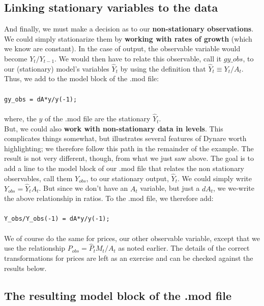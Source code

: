 \subsection{Linking stationary variables to the data}
And finally, we must make a decision as to our \textbf{non-stationary observations}. We could simply stationarize them by \textbf{working with rates of growth} (which we know are constant). In the case of output, the observable variable would become $Y_t /Y_{t-1}$. We would then have to relate this observable, call it $gy\_{obs}$, to our (stationary) model's variables $\widehat Y_t$ by using the definition that $ \widehat{Y}_t \equiv Y_t/ A_t$. Thus, we add to the model block of the .mod file: \\
\\
\texttt{gy\_obs = dA*y/y(-1);}\\
\\
where, the $y$ of the .mod file are the stationary $\widehat Y_t$.\\

But, we could also \textbf{work with non-stationary data in levels}. This complicates things somewhat, but illustrates several features of Dynare worth highlighting; we therefore follow this path in the remainder of the example. The result is not very different, though, from what we just saw above. The goal is to add a line to the model block of our .mod file that relates the non stationary observables, call them $Y_{obs}$, to our stationary output, $\widehat Y_t$. We could simply write $Y_{obs} = \widehat Y_t A_t$. But since we don't have an $A_t$ variable, but just a $dA_t$, we we-write the above relationship in ratios. To the .mod file, we therefore add:\\
\\
\texttt{Y\_obs/Y\_obs(-1) = dA*y/y(-1);}\\
\\
We of course do the same for prices, our other observable variable, except that we use the relationship $P_{obs} = \widehat P_t M_t/A_t$ as noted earlier. The details of the correct transformations for prices are left as an exercise and can be checked against the results below.\\

\subsection{The resulting model block of the .mod file}

